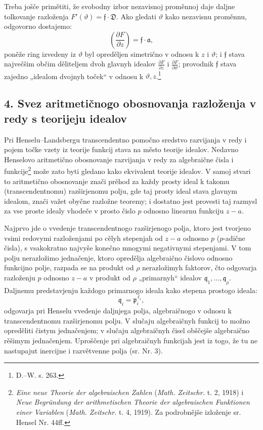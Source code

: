 \documentclass[11pt]{article}
\providecommand{\p}{\partial}
\providecommand{\frD}{\mathfrak D}
\providecommand{\frf}{\mathfrak f}
\providecommand{\fra}{\mathfrak a}
\providecommand{\frp}{\mathfrak p}
\begin{document}
Treba jošče primětiti, že svobodny izbor nezavisnoj proměnnoj daje daljne tolkovanje razloženja \(F'(\vartheta)=\frf\cdot\frD\). Ako gledati \(\vartheta\) kako nezavisnu proměnnu, odgovorno dostajemo:
\[
\left(\frac{\p F}{\p z}\right)=\frf\cdot\fra,
\]
poněže ring izvedeny iz \(\vartheta\) byl opreděljen simetrično v odnosu k \(z\) i \(\vartheta\); i \(\frf\) stava največšim občim děliteljem dvoh glavnyh idealov \(\frac{\p F}{\p z}\) i \(\frac{\p F}{\p\vartheta}\); provodnik \(\frf\) stava zajedno „idealom dvojnyh toček“ v odnosu k \(\vartheta,z\).\footnote{D.--W. s. 263.}

\subsection*{4. Svez aritmetičnogo obosnovanja razloženja v redy s teorijeju idealov}
Pri Henselu--Landsbergu transcendentno pomočno sredstvo razvijanja v redy i pojem točke vzety iz teorije funkcij stava na město teorije idealov. Nedavno Henselovo aritmetično obosnovanje razvijanja v redy za algebraične čisla i funkcije\footnote{\emph{Eine neue Theorie der algebraischen Zahlen} (\emph{Math. Zeitschr.} t. 2, 1918) i \emph{Neue Begründung der arithmetischen Theorie der algebraischen Funktionen einer Variablen} (\emph{Math. Zeitschr.} t. 4, 1919). Za podrobnějše izloženje sr. Hensel Nr. 44ff.} može zato byti gledano kako ekvivalent teorije idealov. V samoj stvari to aritmetično obosnovanje znači prěhod za každy prosty ideal k takomu (transcendentnomu) razširjenomu polju, gde taj prosty ideal stava glavnym idealom, znači važet obyčne razložne teoremy; i dostatno jest provesti taj razmysl za vse proste idealy vhodeče v prosto čislo \(p\) odnosno linearnu funkciju \(z-a\).

Najprvo jde o vvedenje transcendentnogo razširjenogo polja, ktoro jest tvorjeno vsimi redovymi razloženjami po cělyh stepenjah od \(z-a\) odnosno \(p\) (\(p\)-adične čisla), s vsakokratno najvyše konečno mnogymi negativnymi stepenjami. V tom polju nerazložimo jednačenje, ktoro opredělja algebraično čislovo odnosno funkcijno polje, razpada se na produkt od \(\rho\) nerazložimyh faktorov, čto odgovarja razloženju \(p\) odnosno \(z-a\) v produkt od \(\rho\) „primarnyh“ idealov \(\mathfrak q_1,\ldots,\mathfrak q_\rho\). Daljnemu predstavjenju každogo primarnogo ideala kako stepena prostogo ideala:
\[
\mathfrak q_i=\frp_i^{\,\ell_i},
\]
odgovarja pri Henselu vvedenje daljnjega polja, algebraičnogo v odnosu k transcendentnomu razširjenomu polju. V slučaju algebraičnyh funkcij to možno opreděliti čistym jednačenjem; v slučaju algebraičnyh čisel obščejše algebraično rěšimym jednačenjem. Uproščenje pri algebraičnyh funkcijah jest iz togo, že tu ne nastupajut inercijne i razvětvenne polja (sr. Nr. 3).
\end{document}

